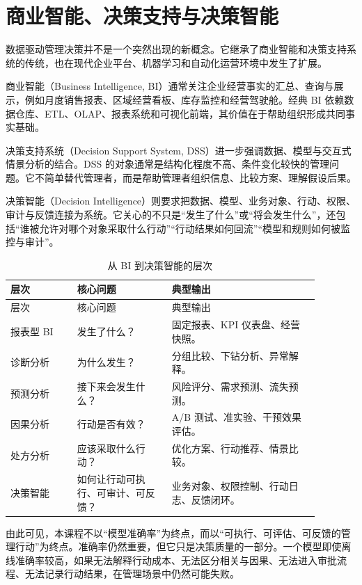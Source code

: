 \documentclass[UTF8,fontset=fandol,openany,zihao=-4]{ctexbook}
\begin{document}
\section{商业智能、决策支持与决策智能}

数据驱动管理决策并不是一个突然出现的新概念。它继承了商业智能和决策支持系统的传统，也在现代企业平台、机器学习和自动化运营环境中发生了扩展。

商业智能（Business Intelligence, BI）通常关注企业经营事实的汇总、查询与展示，例如月度销售报表、区域经营看板、库存监控和经营驾驶舱。经典 BI 依赖数据仓库、ETL、OLAP、报表系统和可视化前端，其价值在于帮助组织形成共同事实基础。

决策支持系统（Decision Support System, DSS）进一步强调数据、模型与交互式情景分析的结合。DSS 的对象通常是结构化程度不高、条件变化较快的管理问题。它不简单替代管理者，而是帮助管理者组织信息、比较方案、理解假设后果。

决策智能（Decision Intelligence）则要求把数据、模型、业务对象、行动、权限、审计与反馈连接为系统。它关心的不只是“发生了什么”或“将会发生什么”，还包括“谁被允许对哪个对象采取什么行动”“行动结果如何回流”“模型和规则如何被监控与审计”。

\begin{longtable}{p{0.19\linewidth}p{0.27\linewidth}p{0.42\linewidth}}
\caption{从 BI 到决策智能的层次}\\
\toprule
层次 & 核心问题 & 典型输出\\
\midrule
\endfirsthead
\toprule
层次 & 核心问题 & 典型输出\\
\midrule
\endhead
报表型 BI & 发生了什么？ & 固定报表、KPI 仪表盘、经营快照。\\
诊断分析 & 为什么发生？ & 分组比较、下钻分析、异常解释。\\
预测分析 & 接下来会发生什么？ & 风险评分、需求预测、流失预测。\\
因果分析 & 行动是否有效？ & A/B 测试、准实验、干预效果评估。\\
处方分析 & 应该采取什么行动？ & 优化方案、行动推荐、情景比较。\\
决策智能 & 如何让行动可执行、可审计、可反馈？ & 业务对象、权限控制、行动日志、反馈闭环。\\
\bottomrule
\end{longtable}

由此可见，本课程不以“模型准确率”为终点，而以“可执行、可评估、可反馈的管理行动”为终点。准确率仍然重要，但它只是决策质量的一部分。一个模型即使离线准确率较高，如果无法解释行动成本、无法区分相关与因果、无法进入审批流程、无法记录行动结果，在管理场景中仍然可能失败。
\end{document}
